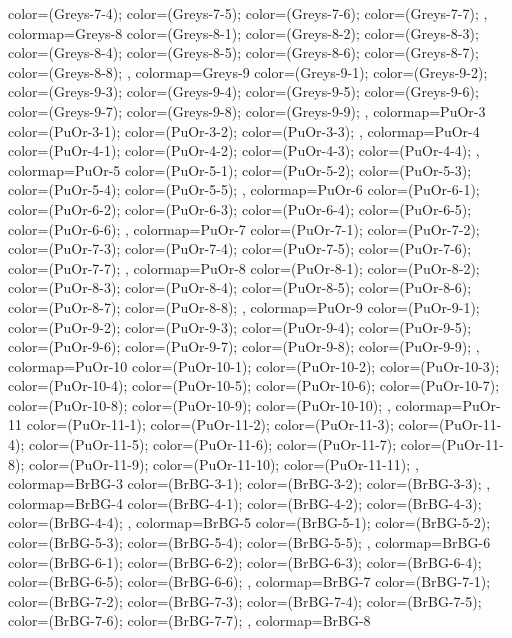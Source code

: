{{  color=(Greys-7-4);
  color=(Greys-7-5);
  color=(Greys-7-6);
  color=(Greys-7-7);
},
colormap={Greys-8}{
  color=(Greys-8-1);
  color=(Greys-8-2);
  color=(Greys-8-3);
  color=(Greys-8-4);
  color=(Greys-8-5);
  color=(Greys-8-6);
  color=(Greys-8-7);
  color=(Greys-8-8);
},
colormap={Greys-9}{
  color=(Greys-9-1);
  color=(Greys-9-2);
  color=(Greys-9-3);
  color=(Greys-9-4);
  color=(Greys-9-5);
  color=(Greys-9-6);
  color=(Greys-9-7);
  color=(Greys-9-8);
  color=(Greys-9-9);
},
colormap={PuOr-3}{
  color=(PuOr-3-1);
  color=(PuOr-3-2);
  color=(PuOr-3-3);
},
colormap={PuOr-4}{
  color=(PuOr-4-1);
  color=(PuOr-4-2);
  color=(PuOr-4-3);
  color=(PuOr-4-4);
},
colormap={PuOr-5}{
  color=(PuOr-5-1);
  color=(PuOr-5-2);
  color=(PuOr-5-3);
  color=(PuOr-5-4);
  color=(PuOr-5-5);
},
colormap={PuOr-6}{
  color=(PuOr-6-1);
  color=(PuOr-6-2);
  color=(PuOr-6-3);
  color=(PuOr-6-4);
  color=(PuOr-6-5);
  color=(PuOr-6-6);
},
colormap={PuOr-7}{
  color=(PuOr-7-1);
  color=(PuOr-7-2);
  color=(PuOr-7-3);
  color=(PuOr-7-4);
  color=(PuOr-7-5);
  color=(PuOr-7-6);
  color=(PuOr-7-7);
},
colormap={PuOr-8}{
  color=(PuOr-8-1);
  color=(PuOr-8-2);
  color=(PuOr-8-3);
  color=(PuOr-8-4);
  color=(PuOr-8-5);
  color=(PuOr-8-6);
  color=(PuOr-8-7);
  color=(PuOr-8-8);
},
colormap={PuOr-9}{
  color=(PuOr-9-1);
  color=(PuOr-9-2);
  color=(PuOr-9-3);
  color=(PuOr-9-4);
  color=(PuOr-9-5);
  color=(PuOr-9-6);
  color=(PuOr-9-7);
  color=(PuOr-9-8);
  color=(PuOr-9-9);
},
colormap={PuOr-10}{
  color=(PuOr-10-1);
  color=(PuOr-10-2);
  color=(PuOr-10-3);
  color=(PuOr-10-4);
  color=(PuOr-10-5);
  color=(PuOr-10-6);
  color=(PuOr-10-7);
  color=(PuOr-10-8);
  color=(PuOr-10-9);
  color=(PuOr-10-10);
},
colormap={PuOr-11}{
  color=(PuOr-11-1);
  color=(PuOr-11-2);
  color=(PuOr-11-3);
  color=(PuOr-11-4);
  color=(PuOr-11-5);
  color=(PuOr-11-6);
  color=(PuOr-11-7);
  color=(PuOr-11-8);
  color=(PuOr-11-9);
  color=(PuOr-11-10);
  color=(PuOr-11-11);
},
colormap={BrBG-3}{
  color=(BrBG-3-1);
  color=(BrBG-3-2);
  color=(BrBG-3-3);
},
colormap={BrBG-4}{
  color=(BrBG-4-1);
  color=(BrBG-4-2);
  color=(BrBG-4-3);
  color=(BrBG-4-4);
},
colormap={BrBG-5}{
  color=(BrBG-5-1);
  color=(BrBG-5-2);
  color=(BrBG-5-3);
  color=(BrBG-5-4);
  color=(BrBG-5-5);
},
colormap={BrBG-6}{
  color=(BrBG-6-1);
  color=(BrBG-6-2);
  color=(BrBG-6-3);
  color=(BrBG-6-4);
  color=(BrBG-6-5);
  color=(BrBG-6-6);
},
colormap={BrBG-7}{
  color=(BrBG-7-1);
  color=(BrBG-7-2);
  color=(BrBG-7-3);
  color=(BrBG-7-4);
  color=(BrBG-7-5);
  color=(BrBG-7-6);
  color=(BrBG-7-7);
},
colormap={BrBG-8}{
}}
